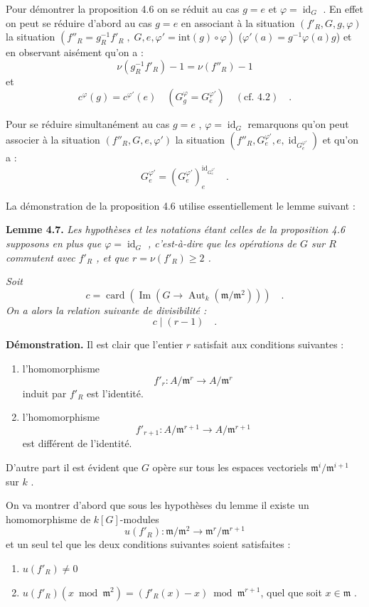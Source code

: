 \documentclass[11pt]{article}
\providecommand{\fm}{\mathfrak{m}}
\providecommand{\id}{\operatorname{id}}
\providecommand{\id}{\operatorname{id}}
\providecommand{\id}{\operatorname{id}}
\providecommand{\Aut}{\operatorname{Aut}}
\providecommand{\id}{\operatorname{id}}
\providecommand{\id}{\operatorname{id}}
\providecommand{\im}{\operatorname{Im}}
\providecommand{\fm}{\mathfrak m}
\providecommand{\card}{\operatorname{card}}
\providecommand{\im}{\operatorname{im}}
\providecommand{\Aut}{\operatorname{Aut}}
\providecommand{\id}{\operatorname{id}}
\begin{document}
\medskip

Pour démontrer la proposition 4.6 on se réduit au cas $g = e$ et $\varphi = \id_G$ . En effet on peut se réduire d'abord au cas $g = e$ en associant à la situation $(f'_R, G, g, \varphi)$ la situation $(f''_R = g_R^{-1}f'_R \; , \; G, e, \varphi' = \mathrm{int}(g) \circ \varphi)$ ($\varphi'(a) = g^{-1}\varphi(a)g$) et en observant aisément qu'on a :
\[
\nu(g_R^{-1}f'_R) - 1 = \nu(f''_R) - 1
\]
et
\[
c^\varphi(g) = c^{\varphi'}(e) \quad (G_g^\varphi = G_e^{\varphi'}) \quad (\text{cf. 4.2}) \quad .
\]

Pour se réduire simultanément au cas $g = e$ , $\varphi = \id_G$ remarquons qu'on peut associer à la situation $(f''_R, G, e, \varphi')$ la situation $(f''_R, G_e^{\varphi'}, e, \id_{G_e^{\varphi'}})$ et qu'on a :
\[
G_e^{\varphi'} = (G_e^{\varphi'})_e^{\id_{G_e^{\varphi'}}} \quad .
\]

La démonstration de la proposition 4.6 utilise essentiellement le lemme suivant :

\medskip
\noindent
\textbf{Lemme 4.7.} \emph{Les hypothèses et les notations étant celles de la proposition 4.6 supposons en plus que $\varphi = \id_G$ , c'est-à-dire que les opérations de $G$ sur $R$ commutent avec $f'_R$ , et que $r = \nu(f'_R) \geq 2$ .}

\emph{Soit
\[
c = \card(\im(G \longrightarrow \Aut_k(\fm/\fm^2))) \quad .
\]
On a alors la relation suivante de divisibilité :
\[
c \mid (r - 1) \quad .
\]}

\medskip

\noindent
\textbf{Démonstration.} Il est clair que l'entier $r$ satisfait aux conditions suivantes :
\begin{enumerate}
\item[a)] l'homomorphisme
\[
f'_r : A/\fm^r \longrightarrow A/\fm^r
\]
induit par $f'_R$ est l'identité.
\item[b)] l'homomorphisme
\[
f'_{r+1} : A/\fm^{r+1} \longrightarrow A/\fm^{r+1}
\]
est différent de l'identité.
\end{enumerate}

D'autre part il est évident que $G$ opère sur tous les espaces vectoriels $\fm^i/\fm^{i+1}$ sur $k$ .

On va montrer d'abord que sous les hypothèses du lemme il existe un homomorphisme de $k[G]$-modules
\[
u(f'_R) : \fm/\fm^2 \longrightarrow \fm^r/\fm^{r+1}
\]
et un seul tel que les deux conditions suivantes soient satisfaites :
\begin{enumerate}
\item[1)] $u(f'_R) \neq 0$
\item[2)] $u(f'_R)(x \bmod \fm^2) = (f'_R(x) - x) \bmod \fm^{r+1}$, quel que soit $x \in \fm$ .
\end{enumerate}
\end{document}
